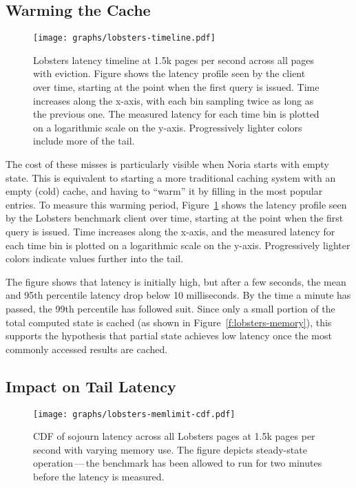\subsection{Warming the Cache}

\begin{figure}[t]
  \centering
  \texttt{[image: graphs/lobsters-timeline.pdf]}
  \caption{Lobsters latency timeline at 1.5k pages per second across all pages
  with eviction. Figure shows the latency profile seen by the client over time,
  starting at the point when the first query is issued. Time increases along the
  x-axis, with each bin sampling twice as long as the previous one. The measured
  latency for each time bin is plotted on a logarithmic scale on the y-axis.
  Progressively lighter colors include more of the tail.}
  \label{f:lobsters-timeline}
\end{figure}

The cost of these misses is particularly visible when Noria starts with empty
state. This is equivalent to starting a more traditional caching system with an
empty (cold) cache, and having to ``warm'' it by filling in the most popular
entries. To measure this warming period, Figure~\ref{f:lobsters-timeline} shows
the latency profile seen by the Lobsters benchmark client over time, starting at
the point when the first query is issued. Time increases along the x-axis, and
the measured latency for each time bin is plotted on a logarithmic scale on the
y-axis. Progressively lighter colors indicate values further into the tail.

The figure shows that latency is initially high, but after a few seconds, the
mean and 95th percentile latency drop below 10 milliseconds. By the time a
minute has passed, the 99th percentile has followed suit. Since only a small
portion of the total computed state is cached (as shown in
Figure~\ref{f:lobsters-memory}), this supports the hypothesis that partial state
achieves low latency once the most commonly accessed results are cached.

\subsection{Impact on Tail Latency}

\begin{figure}[h]
  \centering
  \texttt{[image: graphs/lobsters-memlimit-cdf.pdf]}
  \caption{CDF of sojourn latency across all Lobsters pages at 1.5k pages per
  second with varying memory use. The figure depicts steady-state
  operation\,---\,the benchmark has been allowed to run for two minutes before
  the latency is measured.}
  \label{f:lobsters-mem-latency}
\end{figure}

